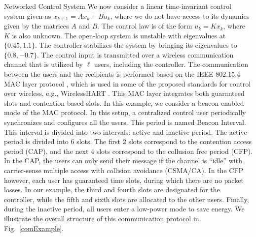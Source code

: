 \begin{subsection}{Networked Control System}\label{networkedEx}
We now consider a linear time-invariant control system given as \mbox{$x_{k+1}=Ax_k+Bu_k$,} where we do not have access to its dynamics given by the matrices $A$ and $B$. The control law is of the form $u_k = Kx_k$, where $K$ is also unknown. The open-loop system is unstable with eigenvalues at $\{0.45, 1.1\}$. The controller stabilizes the system by bringing its eigenvalues to $\{0.8, -0.7\}$.
The control input is transmitted
over a wireless communication channel that is utilized by $\ell$ users, including the controller. The communication between the users and the recipients is performed based on the IEEE 802.15.4 MAC layer protocol \cite{macLayer}, which is used in
some of the proposed standards for control over wireless, e.g., WirelessHART \cite{wirelessHart}. This MAC layer integrates both guaranteed slots and contention based slots. In this example, we consider a beacon-enabled mode of the MAC protocol. In this setup, a centralized control user periodically synchronizes and configures all the users. This period is named Beacon Interval. This interval is divided into two intervals: active and inactive period. The active period is divided into 6 slots. The first 2 slots correspond to the contention access period (CAP), and the next 4 slots correspond to the collusion free period (CFP). In the CAP, the users can only send their message if the channel is ``idle'' with carrier-sense multiple access with collision avoidance (CSMA/CA). In the CFP however, each user has guaranteed time slots, during which there are no packet losses. In our example, the third and fourth slots are designated for the controller, while the fifth and sixth slots are allocated to the other users. Finally, during the inactive period, all users enter a low-power mode to save energy. We illustrate the overall structure of this communication protocol in Fig.~\ref{comExample}. 

\end{subsection}
